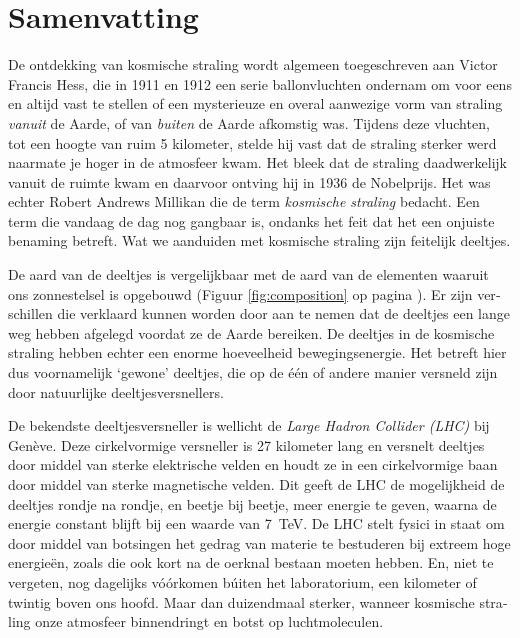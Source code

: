 \chapter{Samenvatting}

\begin{otherlanguage}{dutch}

De ontdekking van kosmische straling wordt algemeen toegeschreven aan
Victor Francis Hess, die in 1911 en 1912 een serie ballonvluchten ondernam
om voor eens en altijd vast te stellen of een mysterieuze en overal
aanwezige vorm van straling \emph{vanuit} de Aarde, of van \emph{buiten}
de Aarde afkomstig was.  Tijdens deze vluchten, tot een hoogte van ruim 5
kilometer, stelde hij vast dat de straling sterker werd naarmate je hoger
in de atmosfeer kwam.  Het bleek dat de straling daadwerkelijk vanuit de
ruimte kwam en daarvoor ontving hij in 1936 de Nobelprijs.  Het was echter
Robert Andrews Millikan die de term \emph{kosmische straling} bedacht.
Een term die vandaag de dag nog gangbaar is, ondanks het feit dat het een
onjuiste benaming betreft.  Wat we aanduiden met kosmische straling zijn
feitelijk deeltjes.

De aard van de deeltjes is vergelijkbaar met de aard van de elementen
waaruit ons zonnestelsel is opgebouwd (Figuur \ref{fig:composition} op
pagina \pageref{fig:composition}).  Er zijn verschillen die verklaard
kunnen worden door aan te nemen dat de deeltjes een lange weg hebben
afgelegd voordat ze de Aarde bereiken.  De deeltjes in de kosmische
straling hebben echter een enorme hoeveelheid bewegingsenergie.  Het
betreft hier dus voornamelijk `gewone' deeltjes, die op de één of andere
manier versneld zijn door natuurlijke deeltjesversnellers.

De bekendste deeltjesversneller is wellicht de \emph{Large Hadron Collider
(LHC)} bij Genève.  Deze cirkelvormige versneller is 27 kilometer lang en
versnelt deeltjes door middel van sterke elektrische velden en houdt ze in
een cirkelvormige baan door middel van sterke magnetische velden.  Dit
geeft de LHC de mogelijkheid de deeltjes rondje na rondje, en beetje bij
beetje, meer energie te geven, waarna de energie constant blijft bij een
waarde van \SI{7}{\tera\electronvolt}.  De LHC stelt fysici in staat om
door middel van botsingen het gedrag van materie te bestuderen bij extreem
hoge energieën, zoals die ook kort na de oerknal bestaan moeten hebben.
En, niet te vergeten, nog dagelijks vóórkomen búiten het laboratorium, een
kilometer of twintig boven ons hoofd.  Maar dan duizendmaal sterker,
wanneer kosmische straling onze atmosfeer binnendringt en botst op
luchtmoleculen.


\end{otherlanguage}
